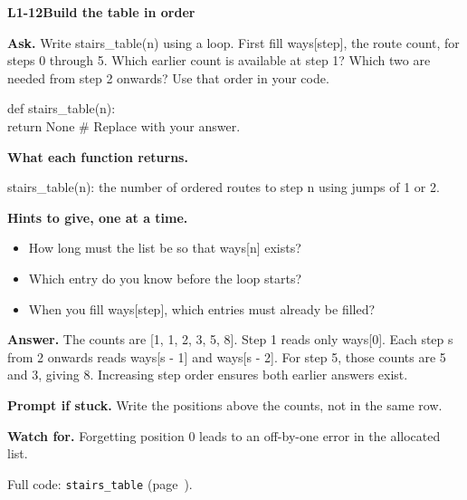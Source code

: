 \documentclass[11pt,a4paper]{article}
\begin{document}
\noindent\begin{minipage}{\textwidth}
{\color{teal}\textbf{L1-12}}\quad \textbf{Build the table in order}\par\smallskip
\textbf{Ask.} Write stairs\_table(n) using a loop. First fill ways[step], the route count, for steps 0 through 5. Which earlier count is available at step 1? Which two are needed from step 2 onwards? Use that order in your code.\par\smallskip
\par{}\par\smallskip\noindent\colorbox{codepaper}{\parbox{\dimexpr\linewidth-2\fboxsep\relax}{\small\ttfamily\raggedright def stairs\_table(n):\\\hspace*{2.4em}return None  \# Replace with your answer.}}\par
{\small\textbf{What each function returns.}\par stairs\_table(n): the number of ordered routes to step n using jumps of 1 or 2.\par }
{\small\textbf{Hints to give, one at a time.}}\begin{itemize}\item How long must the list be so that ways[n] exists?\item Which entry do you know before the loop starts?\item When you fill ways[step], which entries must already be filled?\end{itemize}
\textbf{Answer.} The counts are [1, 1, 2, 3, 5, 8]. Step 1 reads only ways[0]. Each step s from 2 onwards reads ways[s - 1] and ways[s - 2]. For step 5, those counts are 5 and 3, giving 8. Increasing step order ensures both earlier answers exist.\par\smallskip
\textbf{Prompt if stuck.} Write the positions above the counts, not in the same row.\par\smallskip
\textbf{Watch for.} Forgetting position 0 leads to an off-by-one error in the allocated list.\par\smallskip Full code: \texttt{stairs\_table} (page~\pageref{L1-code-stairs_table}).
\end{minipage}\par{}\medskip
\end{document}
